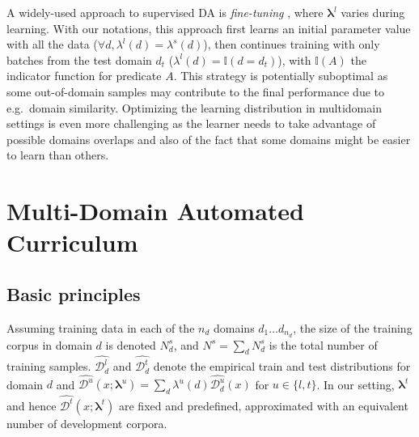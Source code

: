 \documentclass[11pt]{article}
\newcommand{\fyDone}[1]{\done[FY]\Todo[FY:]{\textcolor{orange}{#1}}}
\newcommand{\revision}[1]{\textcolor{red}{#1}}
\newcommand{\system}[1]{\texttt{{#1}}}
\newcommand{\vlambda}{\ensuremath{\boldsymbol\lambda}\xspace} %
\newcommand{\indic}[1]{\ensuremath{\mathbb{I}(#1)}}
\begin{document}
A widely-used approach to supervised DA is \emph{fine-tuning} \cite{Luong15stanford}, where $\vlambda^{l}$ varies during learning. With our notations, this approach first learns an initial parameter value with all the data ($\forall d, \lambda^{l}(d) = \lambda^{s}(d)$), then continues training with only batches from the test domain $d_t$ ($\lambda^{l}(d) = \indic{d = d_t}$), with $\indic{A}$ the indicator function for predicate $A$. This strategy is potentially suboptimal as some out-of-domain samples may contribute to the final performance due to e.g.\ domain similarity. Optimizing the learning distribution in multidomain settings is even more challenging as the learner needs to take advantage of possible domains overlaps and also of the fact that some domains might be easier to learn than others.\fyDone{How to measure this?}

\section{Multi-Domain Automated Curriculum } \label{sec:mdac}
\subsection{Basic principles}
Assuming training data in each of the $n_d$ domains $d_1 \dots d_{n_d}$, the size of the training corpus in domain $d$ is denoted $N^{s}_d$, and $N^{s} = \sum_d N^{s}_d$ is the total number of training samples. $\widehat{\mathcal{D}^l_d}$ and $\widehat{\mathcal{D}^t_d}$ denote the empirical train and test distributions for domain $d$ and $\widehat{\mathcal{D}^{u}}(x;\vlambda^{u}) = \sum_{d} \lambda^{u}(d) \widehat{\mathcal{D}^{u}_d}(x)$ for $u\in\{l,t\}$. In our setting,  $\vlambda^{t}$ and hence $\widehat{\mathcal{D}^t}(x;\vlambda^t)$ are fixed and predefined, approximated with an equivalent number of development corpora. 
\end{document}

